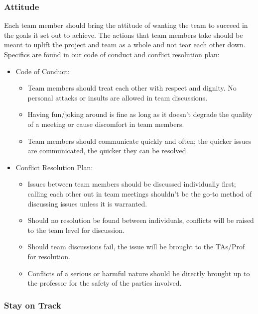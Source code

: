 \documentclass{article}
\begin{document}
\subsubsection*{Attitude}

Each team member should bring the attitude of wanting the team to succeed in the goals it set out to achieve. The actions that team members take should be meant to uplift the project and team as a whole and not tear each other down. Specifics are found in our code of conduct and conflict resolution plan: 
\begin{itemize}
  \item Code of Conduct: 
  \begin{itemize}
    \item Team members should treat each other with respect and dignity. No personal attacks or insults are allowed in team discussions. 
    \item Having fun/joking around is fine as long as it doesn't degrade the quality of a meeting or cause discomfort in team members. 
    \item Team members should communicate quickly and often; the quicker issues are communicated, the quicker they can be resolved. 
  \end{itemize}
  \item Conflict Resolution Plan: 
  \begin{itemize}
    \item Issues between team members should be discussed individually first; calling each other out in team meetings shouldn't be the go-to method of discussing issues unless it is warranted.
    \item Should no resolution be found between individuals, conflicts will be raised to the team level for discussion.
    \item Should team discussions fail, the issue will be brought to the TAs/Prof for resolution.
    \item Conflicts of a serious or harmful nature should be directly brought up to the professor for the safety of the parties involved.
  \end{itemize}
\end{itemize}


\subsubsection*{Stay on Track}
\end{document}
